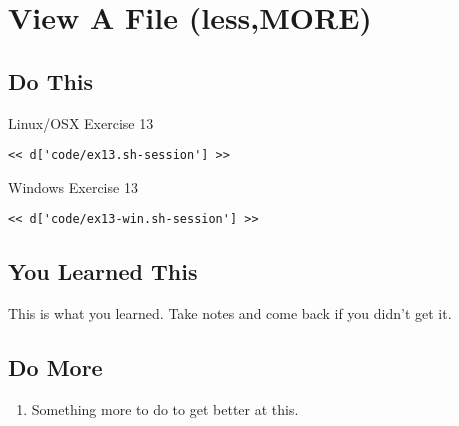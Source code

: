 \chapter{View A File (less,MORE)}

\section{Do This}

\begin{code}{Linux/OSX Exercise 13}
\begin{Verbatim}
<< d['code/ex13.sh-session'] >>
\end{Verbatim}
\end{code}

\begin{code}{Windows Exercise 13}
\begin{Verbatim}
<< d['code/ex13-win.sh-session'] >>
\end{Verbatim}
\end{code}

\section{You Learned This}

This is what you learned.  Take notes and come back if you didn't get it.

\section{Do More}

\begin{enumerate}
\item Something more to do to get better at this.
\end{enumerate}


